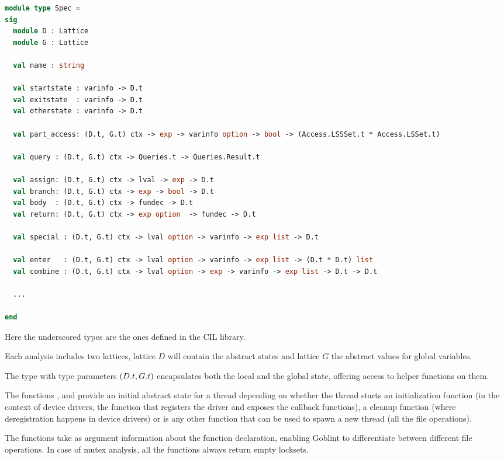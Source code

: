 \documentclass[..thesis.tex]{subfiles}
\begin{document}
\begin{lstlisting}[language=Caml,style=caml]
module type Spec =
sig
  module D : Lattice
  module G : Lattice

  val name : string

  val startstate : varinfo -> D.t
  val exitstate  : varinfo -> D.t
  val otherstate : varinfo -> D.t

  val part_access: (D.t, G.t) ctx -> exp -> varinfo option -> bool -> (Access.LSSSet.t * Access.LSSet.t)

  val query : (D.t, G.t) ctx -> Queries.t -> Queries.Result.t

  val assign: (D.t, G.t) ctx -> lval -> exp -> D.t
  val branch: (D.t, G.t) ctx -> exp -> bool -> D.t
  val body  : (D.t, G.t) ctx -> fundec -> D.t
  val return: (D.t, G.t) ctx -> exp option  -> fundec -> D.t

  val special : (D.t, G.t) ctx -> lval option -> varinfo -> exp list -> D.t

  val enter   : (D.t, G.t) ctx -> lval option -> varinfo -> exp list -> (D.t * D.t) list
  val combine : (D.t, G.t) ctx -> lval option -> exp -> varinfo -> exp list -> D.t -> D.t

  ...

end
\end{lstlisting}

Here the underscored types are the ones defined in the CIL library.

Each analysis includes two lattices, lattice $D$ will contain the abstract states and lattice $G$ the abstract values for global variables.

The type  with type parameters $\left( D.t, G.t \right)$ encapsulates both the local and the global state, offering access to helper functions on them. 

The functions , and  provide an initial abstract state for a thread depending on whether the thread starts an
initialization function (in the context of device drivers, the function that registers the driver and exposes the callback functions),
a cleanup function (where deregistration happens in device drivers) or is any other function that can be used to spawn a new thread (all the file operations).

The functions take as argument information about the function declaration, enabling Goblint to differentiate between different file operations.
In case of mutex analysis, all the functions always return empty locksets.
\end{document}
